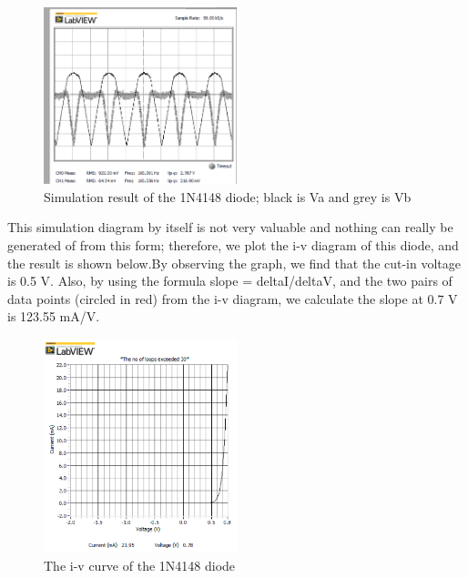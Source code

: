 \documentclass[letterpaper, 10 pt, conference]{ieeeconf}  %
\begin{document}
	\begin{figure}[h]
        \centering
        \includegraphics[width=0.5\textwidth]{images/result2.png}
        \caption{Simulation result of the 1N4148 diode; black is Va and grey is Vb}
    \end{figure}
	This simulation diagram by itself is not very valuable and nothing can really be generated of from this form; therefore, we plot the i-v diagram of this diode, and the result is shown below.By observing the graph, we find that the cut-in voltage is 0.5 V. Also, by using the formula slope = deltaI/deltaV, and the two pairs of data points (circled in red) from the i-v diagram, we calculate the slope at 0.7 V is 123.55 mA/V.\newline
	\begin{figure}[h]
        \centering
        \includegraphics[width=0.5\textwidth]{images/result3.png}
        \caption{The i-v curve of the 1N4148 diode}
    \end{figure}
\end{document}
